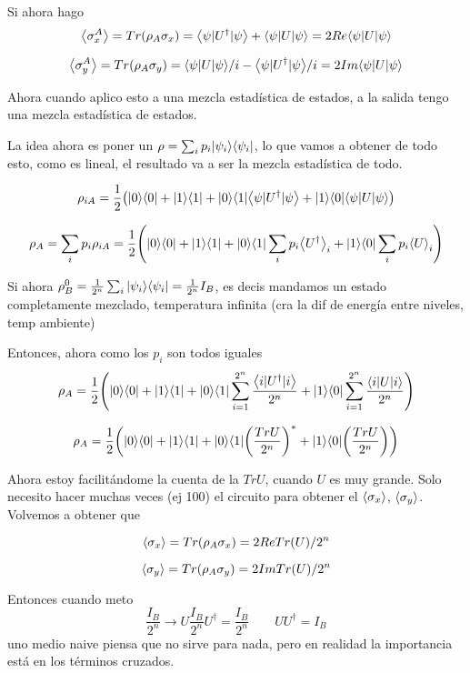 Si ahora hago 
\[
\VALMEDIO{\sigma_{x}^{A}}=Tr\PARENTESIS{\rho_{A}\sigma_{x}}=\EXPECT{\psi}{\psi}{U^{\dagger}}+\EXPECT{\psi}{\psi}U=2Re\EXPECT{\psi}{\psi}U
\]

\[
\VALMEDIO{\sigma_{y}^{A}}=Tr\PARENTESIS{\rho_{A}\sigma_{y}}=\EXPECT{\psi}{\psi}U/i-\EXPECT{\psi}{\psi}{U^{\dagger}}/i=2Im\EXPECT{\psi}{\psi}U
\]

Ahora cuando aplico esto a una mezcla estadística de estados, a la
salida tengo una mezcla estadística de estados.

La idea ahora es poner un $\rho=\sum_{i}p_{i}|\psi_{i} \rangle\langle \psi_{i}|$,
lo que vamos a obtener de todo esto, como es lineal, el resultado
va a ser la mezcla estadística de todo.

\[
\rho_{iA}=\frac{1}{2}\PARENTESIS{\PROYECT 00+\PROYECT 11+\PROYECT 01\EXPECT{\psi}{\psi}{U^{\dagger}}+\PROYECT 10\EXPECT{\psi}{\psi}U}
\]

\[
\rho_{A}=\sum_{i}p_{i}\rho_{iA}=\frac{1}{2}\PARENTESIS{\PROYECT 00+\PROYECT 11+\PROYECT 01\sum_{i}p_{i}\VALMEDIO{U^{\dagger}}_{i}+\PROYECT 10\sum_{i}p_{i}\VALMEDIO U_{i}}
\]

Si ahora $\rho_{B}^{0}=\frac{1}{2^{n}}\sum_{i}|\psi_{i} \rangle\langle \psi_{i}|=\frac{1}{2^{n}}I_{B}$,
es decis mandamos un estado completamente mezclado, temperatura infinita
(cra la dif de energía entre niveles, temp ambiente)

Entonces, ahora como los $p_{i}$ son todos iguales 
\[
\rho_{A}=\frac{1}{2}\PARENTESIS{\PROYECT 00+\PROYECT 11+\PROYECT 01\sum_{i=1}^{2^{n}}\frac{\EXPECT ii{U^{\dagger}}}{2^{n}}+\PROYECT 10\sum_{i=1}^{2^{n}}\frac{\EXPECT iiU}{2^{n}}}
\]

\[
\rho_{A}=\frac{1}{2}\PARENTESIS{\PROYECT 00+\PROYECT 11+\PROYECT 01\PARENTESIS{\frac{TrU}{2^{n}}}^{*}+\PROYECT 10\PARENTESIS{\frac{TrU}{2^{n}}}}
\]

Ahora estoy facilitándome la cuenta de la $TrU$, cuando $U$ es muy
grande. Solo necesito hacer muchas veces (ej 100) el circuito para
obtener el $\VALMEDIO{\sigma_{x}}$, $\VALMEDIO{\sigma_{y}}$. Volvemos
a obtener que 

\[
\VALMEDIO{\sigma_{x}}=Tr\PARENTESIS{\rho_{A}\sigma_{x}}=2ReTr\PARENTESIS U/2^{n}
\]

\[
\VALMEDIO{\sigma_{y}}=Tr\PARENTESIS{\rho_{A}\sigma_{y}}=2ImTr\PARENTESIS U/2^{n}
\]

Entonces cuando meto 
\[
\frac{I_{B}}{2^{n}}\rightarrow U\frac{I_{B}}{2^{n}}U^{\dagger}=\frac{I_{B}}{2^{n}}\qquad UU^{\dagger}=I_{B}
\]
uno medio naive piensa que no sirve para nada, pero en realidad la
importancia está en los términos cruzados. 

